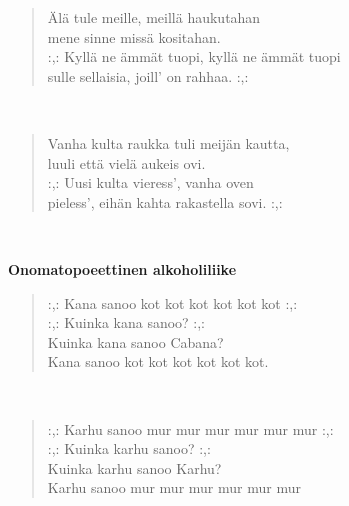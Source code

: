 \noindent\begin{minipage}{\linewidth}
\begin{verse}
	Älä tule meille, meillä haukutahan\\
	mene sinne missä kositahan.\\
	\hspace{0pt-\widthof{:,: }}:,: Kyllä ne ämmät tuopi, kyllä ne ämmät tuopi\\
	sulle sellaisia, joill' on rahhaa. :,:\\
\end{verse}
\end{minipage}\\[10pt]
\noindent\begin{minipage}{\linewidth}
\begin{verse}
	Vanha kulta raukka tuli meijän kautta,\\
	luuli että vielä aukeis ovi.\\
	\hspace{0pt-\widthof{:,: }}:,: Uusi kulta vieress', vanha oven\\
	pieless', eihän kahta rakastella sovi. :,:\\
\end{verse}
\end{minipage}\\[10pt]
%
%
\noindent\begin{minipage}{\linewidth}
\vspace{5pt}
\parbox[t]{0.85\linewidth}{\raggedright {\large\bf Onomatopoeettinen alkoholiliike}\\[6pt]}
\begin{verse}
	\hspace{0pt-\widthof{:,: }}:,: Kana sanoo kot kot kot kot kot kot :,:\\
	\hspace{0pt-\widthof{:,: }}:,: Kuinka kana sanoo? :,:\\
	Kuinka kana sanoo Cabana?\\
	Kana sanoo kot kot kot kot kot kot.\\
\end{verse}
\end{minipage}\\[10pt]
\noindent\begin{minipage}{\linewidth}
\begin{verse}
	\hspace{0pt-\widthof{:,: }}:,: Karhu sanoo mur mur mur mur mur mur :,:\\
	\hspace{0pt-\widthof{:,: }}:,: Kuinka karhu sanoo? :,:\\
	Kuinka karhu sanoo Karhu?\\
	Karhu sanoo mur mur mur mur mur mur\\
\end{verse}
\end{minipage}\\[10pt]

